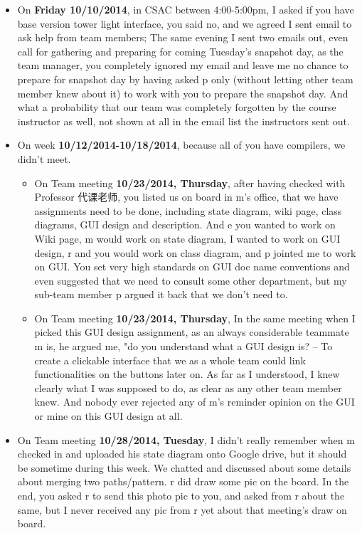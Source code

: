 \documentclass[12pt]{book}
\begin{document}
\begin{itemize}
\item On \textbf{Friday 10/10/2014}, in CSAC between 4:00-5:00pm, I asked if you have base version tower light interface, you said no, and we agreed I sent email to ask help from team members; The same evening I sent two emails out, even call for gathering and preparing for coming Tuesday's snapshot day, as the team manager, you completely ignored my email and leave me no chance to prepare for snapshot day by having asked p only (without letting other team member knew about it) to work with you to prepare the snapshot day. And what a probability that our team was completely forgotten by the course instructor as well, not shown at all in the email list the instructors sent out.

\item On week \textbf{10/12/2014-10/18/2014}, because all of you have compilers, we didn't meet. 

\begin{itemize}
\item On Team meeting \textbf{10/23/2014, Thursday}, after having checked with Professor 代课老师, you listed us on board in m's office, that we have assignments need to be done, including state diagram, wiki page, class diagrams, GUI design and description. And e you wanted to work on Wiki page, m would work on state diagram, I wanted to work on GUI design, r and you would work on class diagram, and p jointed me to work on GUI. You set very high standards on GUI doc name conventions and even suggested that we need to consult some other department, but my sub-team member p argued it back that we don't need to.

\item On Team meeting \textbf{10/23/2014, Thursday}, In the same meeting when I picked this GUI design assignment, as an always considerable teammate m is, he argued me, "do you understand what a GUI design is? -- To create a clickable interface that we as a whole team could link functionalities on the buttons later on.  As far as I understood, I knew clearly what I was supposed to do, as clear as any other team member knew. And nobody ever rejected any of m's reminder opinion on the GUI or mine on this GUI design at all.
\end{itemize}

\item On Team meeting \textbf{10/28/2014, Tuesday}, I didn't really remember when m checked in and uploaded his state diagram onto Google drive, but it should be sometime during this week. We chatted and discussed about some details about merging two paths/pattern. r did draw some pic on the board. In the end, you asked r to send this photo pic to you, and asked from r about the same, but I never received any pic from r yet about that meeting's draw on board. 


\end{itemize}
\end{document}
